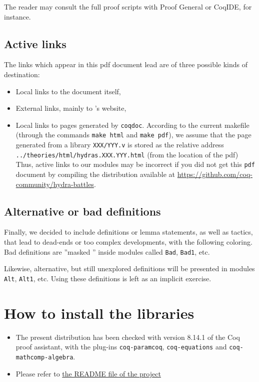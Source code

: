 \documentclass[twoside,a4paper]{book}
\newcounter{snippets}
\begin{document}



The reader may consult the full proof scripts with Proof General or CoqIDE, for instance.

\subsection{Active links}
The  links which appear in this pdf  document lead are of three possible kinds of destination:
\begin{itemize}
\item Local links to the document itself,
\item External links, mainly to \coq's website,
\item Local links to pages generated by \texttt{coqdoc}. According to the current makefile (through the commands \texttt{make html} and \texttt{make pdf}), 
  we assume that the page generated from a library \texttt{XXX/YYY.v} is stored as
the relative address \texttt{../theories/html/hydras.XXX.YYY.html} (from the location of the pdf)
Thus,  active links to our \coq{} modules may be incorrect if you did not get this \texttt{pdf} document by compiling the distribution available at
\url{https://github.com/coq-community/hydra-battles}.

\end{itemize}

\subsection{Alternative or bad definitions}
\label{sect:alt-proofs}
Finally, we decided to include definitions or lemma statements, as well as tactics,  that lead to
dead-ends or too complex developments, with the following coloring.
Bad definitions 
 are ''masked '' inside modules called \texttt{Bad}, \texttt{Bad1}, etc.





Likewise, alternative, but still unexplored definitions will be presented in modules
\texttt{Alt}, \texttt{Alt1}, etc. Using these definitions is left as an implicit exercise.





\section{How to install the libraries}
\label{sec:orgheadline4}
\begin{itemize}
\item The present distribution has been checked with version 8.14.1 of the Coq proof assistant, with the plug-ins \texttt{coq-paramcoq}, \texttt{coq-equations}
and \texttt{coq-mathcomp-algebra}.

\item Please refer to \href{https://github.com/coq-community/hydra-battles#readme}{the README file of the project}
\end{itemize}
\end{document}
